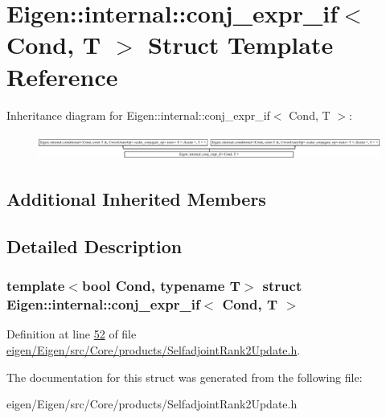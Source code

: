 \hypertarget{struct_eigen_1_1internal_1_1conj__expr__if}{}\section{Eigen\+:\+:internal\+:\+:conj\+\_\+expr\+\_\+if$<$ Cond, T $>$ Struct Template Reference}
\label{struct_eigen_1_1internal_1_1conj__expr__if}
Inheritance diagram for Eigen\+:\+:internal\+:\+:conj\+\_\+expr\+\_\+if$<$ Cond, T $>$\+:\begin{figure}[H]
\begin{center}
\leavevmode
\includegraphics[height=0.847201cm]{struct_eigen_1_1internal_1_1conj__expr__if}
\end{center}
\end{figure}
\subsection*{Additional Inherited Members}


\subsection{Detailed Description}
\subsubsection*{template$<$bool Cond, typename T$>$\newline
struct Eigen\+::internal\+::conj\+\_\+expr\+\_\+if$<$ Cond, T $>$}



Definition at line \hyperlink{eigen_2_eigen_2src_2_core_2products_2_selfadjoint_rank2_update_8h_source_l00052}{52} of file \hyperlink{eigen_2_eigen_2src_2_core_2products_2_selfadjoint_rank2_update_8h_source}{eigen/\+Eigen/src/\+Core/products/\+Selfadjoint\+Rank2\+Update.\+h}.



The documentation for this struct was generated from the following file\+:\begin{DoxyCompactItemize}
\item 
eigen/\+Eigen/src/\+Core/products/\+Selfadjoint\+Rank2\+Update.\+h\end{DoxyCompactItemize}
